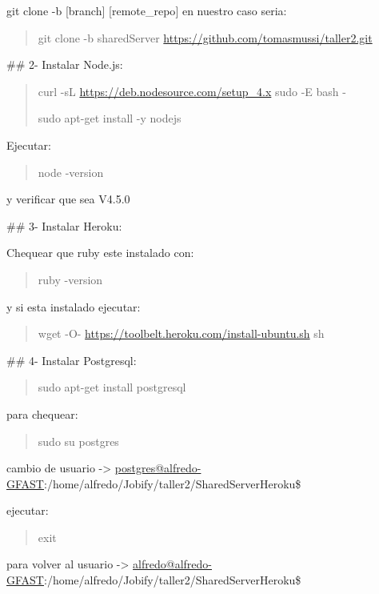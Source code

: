 \documentclass[letterpaper,10pt,spanish]{sphinxmanual}
\begin{document}
git clone -b {[}branch{]} {[}remote\_repo{]} en nuestro caso seria:
\begin{quote}

git clone -b sharedServer \url{https://github.com/tomasmussi/taller2.git}
\end{quote}

\#\# 2- Instalar Node.js:
\begin{quote}

curl -sL \url{https://deb.nodesource.com/setup\_4.x} \textbar{} sudo -E bash -

sudo apt-get install -y nodejs
\end{quote}

Ejecutar:
\begin{quote}

node -version
\end{quote}

y verificar que sea V4.5.0

\#\# 3- Instalar Heroku:

Chequear que ruby este instalado con:
\begin{quote}

ruby -version
\end{quote}

y si esta instalado ejecutar:
\begin{quote}

wget -O- \url{https://toolbelt.heroku.com/install-ubuntu.sh} \textbar{} sh
\end{quote}

\#\# 4- Instalar Postgresql:
\begin{quote}

sudo apt-get install postgresql
\end{quote}

para chequear:
\begin{quote}

sudo su postgres
\end{quote}

cambio de usuario -\textgreater{} \href{mailto:postgres@alfredo-GFAST}{postgres@alfredo-GFAST}:/home/alfredo/Jobify/taller2/SharedServerHeroku\$

ejecutar:
\begin{quote}

exit
\end{quote}

para volver al usuario -\textgreater{} \href{mailto:alfredo@alfredo-GFAST}{alfredo@alfredo-GFAST}:/home/alfredo/Jobify/taller2/SharedServerHeroku\$
\end{document}
